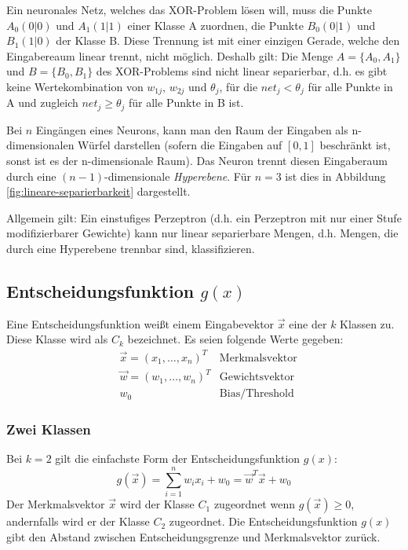Ein neuronales Netz, welches das XOR-Problem lösen will, muss die Punkte $A_0 (0|0)$ und $A_1 (1|1)$ einer Klasse A zuordnen, die Punkte $B_0 (0|1)$ und $B_1 (1|0)$ der Klasse B. Diese Trennung ist mit einer einzigen Gerade, welche den Eingabereaum linear trennt, nicht möglich. 
Deshalb gilt: Die Menge $A = \{A_0, A_1\}$ und $B = \{B_0, B_1\}$ des XOR-Problems sind nicht linear separierbar, d.h. es gibt keine Wertekombination von $w_{1j}$, $w_{2j}$ und $\theta_j$, für die $net_j < \theta_j$ für alle Punkte in A und zugleich $net_j \ge \theta_j$ für alle Punkte in B ist.

Bei $n$ Eingängen eines Neurons, kann man den Raum der Eingaben als n-dimensionalen Würfel darstellen (sofern die Eingaben auf $[0,1]$ beschränkt ist, sonst ist es der n-dimensionale Raum).
Das Neuron trennt diesen Eingaberaum durch eine $(n-1)$-dimensionale \emph{Hyperebene}. Für $n=3$ ist dies in Abbildung \ref{fig:lineare-separierbarkeit} dargestellt.

Allgemein gilt: Ein einstufiges Perzeptron (d.h. ein Perzeptron mit nur einer Stufe modifizierbarer Gewichte) kann nur linear separierbare Mengen, d.h. Mengen, die durch eine Hyperebene trennbar sind, klassifizieren.


\subsection*{Entscheidungsfunktion $g(x)$}
Eine Entscheidungsfunktion weißt einem Eingabevektor $\vec{x}$ eine der $k$ Klassen zu. Diese Klasse wird als $C_k$ bezeichnet.
Es seien folgende Werte gegeben:
\begin{align*}
	& \vec{x} = (x_1, \ldots, x_n)^T &\text{Merkmalsvektor} \\
	& \vec{w} = (w_1, \ldots, w_n)^T &\text{Gewichtsvektor} \\
	& w_0	&\text{Bias/Threshold}
\end{align*}

\subsubsection*{Zwei Klassen}
Bei $k=2$ gilt die einfachste Form der Entscheidungsfunktion $g(x)$:
\[
	g(\vec{x}) = \sum_{i=1}^{n} w_i x_i + w_0 = \vec{w}^T \vec{x} + w_0
\]
Der Merkmalsvektor $\vec{x}$ wird der Klasse $C_1$ zugeordnet wenn $g(\vec{x}) \ge 0$, andernfalls wird er der Klasse $C_2$ zugeordnet. Die Entscheidungsfunktion $g(x)$ gibt den Abstand zwischen Entscheidungsgrenze und Merkmalsvektor zurück. 

